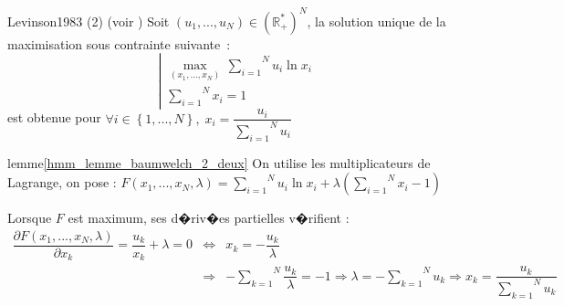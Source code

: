         \begin{xlemma}{Levinson1983 (2)}\label{hmm_lemme_baumwelch_2_deux} (voir )
        Soit $\left(  u_{1},...,u_{N}\right)  \in\left( \mathbb{R}_{+}^{\ast}\right)  ^{N}$, 
        la solution unique de la maximisation sous contrainte suivante~:
                $$
                \left|
                \begin{array}{l}%
                \underset{\left(  x_{1},...,x_{N}\right)  }{\max}\,\overset{N}{\underset
                {i=1}{\sum}}u_{i}\ln x_{i}\\
                \overset{N}{\underset{i=1}{\sum}}x_{i}=1
                \end{array}
                \right.
                $$
        est obtenue pour $\forall i\in\left\{  1,...,N\right\}  ,\; x_{i}=\dfrac{u_{i}}{\overset{N}{\underset{i=1}{\sum}}u_{i}}$
        \end{xlemma}



\begin{xdemo}{lemme}{\ref{hmm_lemme_baumwelch_2_deux}}
On utilise les multiplicateurs de Lagrange, on pose : $F\left(  x_{1} ,...,x_{N},\lambda\right)
=\overset{N}{\underset{i=1}{\sum}}u_{i}\ln x_{i}+\lambda\left(  \overset{N}{\underset{i=1}{\sum}}x_{i}-1\right)  $

Lorsque $F$ est maximum, ses d�riv�es partielles v�rifient :
        \begin{eqnarray*}
        \dfrac{\partial F\left(  x_{1},...,x_{N},\lambda\right)  }{\partial x_{k} }=\dfrac{u_{k}}{x_{k}}+\lambda=0 &\Longleftrightarrow&
            x_{k}=-\dfrac{u_{k} }{\lambda}\\
        &\Longrightarrow& -\overset{N}{\underset{k=1}{\sum}}\dfrac{u_{k}
         }{\lambda}=-1\Longrightarrow\lambda=-\overset{N}{\underset{k=1}{\sum}}
        u_{k}\Longrightarrow x_{k}=\dfrac{u_{k}}{\overset{N}{\underset{k=1}{\sum} }u_{k}}
        \end{eqnarray*}
\end{xdemo}










